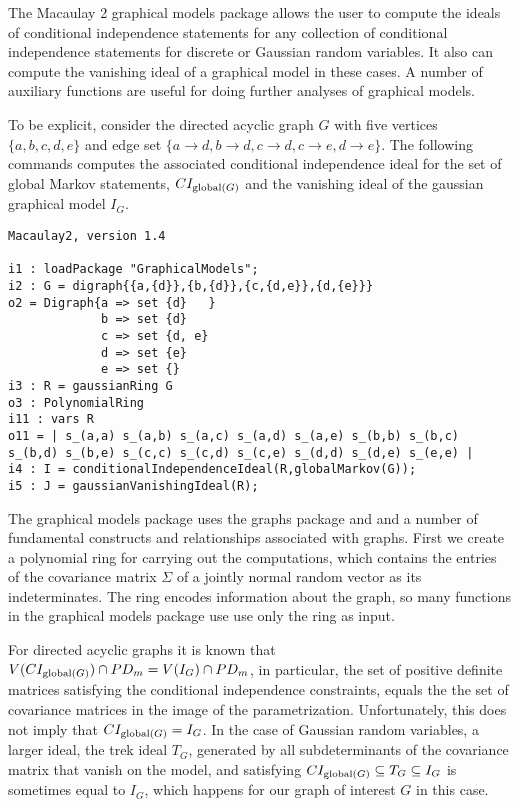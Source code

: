 \documentclass[letterpaper]{article}
\theoremstyle{definition}
\begin{document}
The Macaulay 2 graphical models package allows the user to compute
the ideals of conditional independence statements for any collection
of conditional independence statements for discrete or Gaussian
random variables.  It also can compute the vanishing ideal of 
a graphical model in these cases.  A number of auxiliary functions
are useful for doing further analyses of graphical models.

To be explicit, consider the directed acyclic graph $G$ with  five
vertices $\{a,b,c,d,e\}$ and edge
set $\{a \to d, b \to d, c \to d, c \to e, d \to e\}$.
The following commands computes the associated conditional
independence ideal for the set of global Markov statements,
$CI_{{\rm global}(G)}$ and 
the vanishing ideal of the gaussian graphical model $I_{G}$.

\begin{verbatim}
Macaulay2, version 1.4

i1 : loadPackage "GraphicalModels";
i2 : G = digraph{{a,{d}},{b,{d}},{c,{d,e}},{d,{e}}} 
o2 = Digraph{a => set {d}   }
             b => set {d}
             c => set {d, e}
             d => set {e}
             e => set {}
i3 : R = gaussianRing G
o3 : PolynomialRing
i11 : vars R
o11 = | s_(a,a) s_(a,b) s_(a,c) s_(a,d) s_(a,e) s_(b,b) s_(b,c) s_(b,d) s_(b,e) s_(c,c) s_(c,d) s_(c,e) s_(d,d) s_(d,e) s_(e,e) |
i4 : I = conditionalIndependenceIdeal(R,globalMarkov(G));
i5 : J = gaussianVanishingIdeal(R);
\end{verbatim}
The graphical models package uses the graphs package and 
and a number of fundamental constructs and relationships 
associated with graphs.  First we create a polynomial ring
for carrying out the computations, which contains the entries of
the covariance matrix $\Sigma$ of a jointly normal random vector
as its indeterminates.  The ring encodes information about the
graph, so many functions in the graphical models package use 
use only the ring as input.

For directed acyclic graphs it is known that 
$V(CI_{{\rm global}(G)}) \cap PD_{m}  =  
V(I_{G}) \cap PD_{m}$,
in particular, the set of positive definite matrices
satisfying the conditional independence constraints, equals the
the set of covariance matrices in the image of the parametrization.
Unfortunately, this does not imply that $CI_{{\rm global}(G)} 
=I_{G}$.  In the case of Gaussian random variables, a larger ideal,
the trek ideal $T_{G}$, generated by all subdeterminants of the 
covariance matrix that vanish on the model, and satisfying
$CI_{{\rm global}(G)} \subseteq T_{G} \subseteq
I_{G}$ is sometimes equal to $I_{G}$, which happens for our
graph of interest $G$ in this case.
\end{document}
